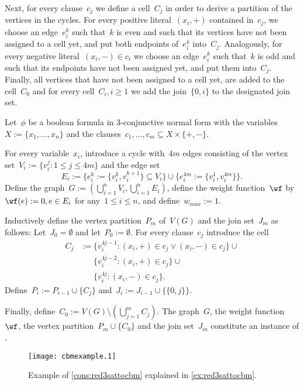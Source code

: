  Next, for every clause~$c_j$ we define a cell~$C_j$ in order to derive a partition of the vertices in the cycles. For every positive literal~$(x_i,+)$ contained in~$c_j$, we choose an edge~$e^k_i$ such that~$k$ is even and such that its vertices have not been assigned to a cell yet, and put both endpoints of~$e^k_i$ into~$C_j$. Analogously, for every negative literal~$(x_i, -) \in c_i$ we choose an edge~$e^k_i$ such that~$k$ is odd and such that its endpoints have not been assigned yet, and put them into~$C_j$. Finally, all vertices that have not been assigned to a cell yet, are added to the cell~$C_0$ and for every cell~$C_i, i \geq 1$ we add the join~$\{0, i\}$ to the designated join set.
\begin{construction}\label{cons:red3sattocbm}
  Let~$\phi$ be a boolean formula in 3-conjunctive normal form with the variables~$X := \{x_1, \ldots, x_n\}$ and the clauses~$c_1, \ldots, c_m \subseteq X \times \{+, -\}$.

  For every variable~$x_i$, introduce a cycle with~$4m$ edges consisting of the vertex set~$V_i := \{v^j_i: 1 \leq j \leq 4m\}$ and the edge set~\[E_i := \{e^k_i := \{v^k_i, v^{k + 1}_i\} \subseteq V_i\} \cup \{e^{4m}_i := \{v^1_i, v^{4m}_i\}\}\text{.}\]
Define the graph~$G := (\bigcup_{i = 1}^n V_i, \bigcup_{i = 1}^n E_i)$, define the weight function~$\wf$ by~$\wf(e) := 0, e \in E_i$ for any~$1 \leq i \leq n$, and define~$w_{max} := 1$.

Inductively define the vertex partition~$P_m$ of~$V(G)$ and the join set~$J_m$ as follows: Let~$J_0 = \emptyset$ and let~$P_0 := \emptyset$. For every clause~$c_j$ introduce the cell
\begin{align*}
  C_j &:= \{v^{4j-1}_i : (x_i, +) \in c_j \vee (x_i, -) \in c_j\} \cup {} \\
        &\phantom{{}:={}} \{v^{4j-2}_i : (x_i, +) \in c_j\} \cup {} \\
        &\phantom{{}:={}} \{v^{4j}_i : (x_i, -) \in c_j \}\text{.}
\end{align*}
Define~$P_i := P_{i-1} \cup \{C_j\}$ and~$J_i := J_{i- 1} \cup \{\{0, j\}\}$.

Finally, define~$C_0 := V(G) \setminus ( \bigcup_{j=1}^m C_j)$. The graph~$G$, the weight function~$\wf$, the vertex partition~$P_m \cup \{C_0\}$ and the join set~$J_m$ constitute an instance of \pCBMs{}.
  
\end{construction}
\begin{figure}
  \begin{center}
    \texttt{[image: cbmexample.1]}
    \caption{Example of \autoref{cons:red3sattocbm} explained in \autoref{ex:red3sattocbm}.}
    \label{fig:red3sattocbm}
  \end{center}
\end{figure}
